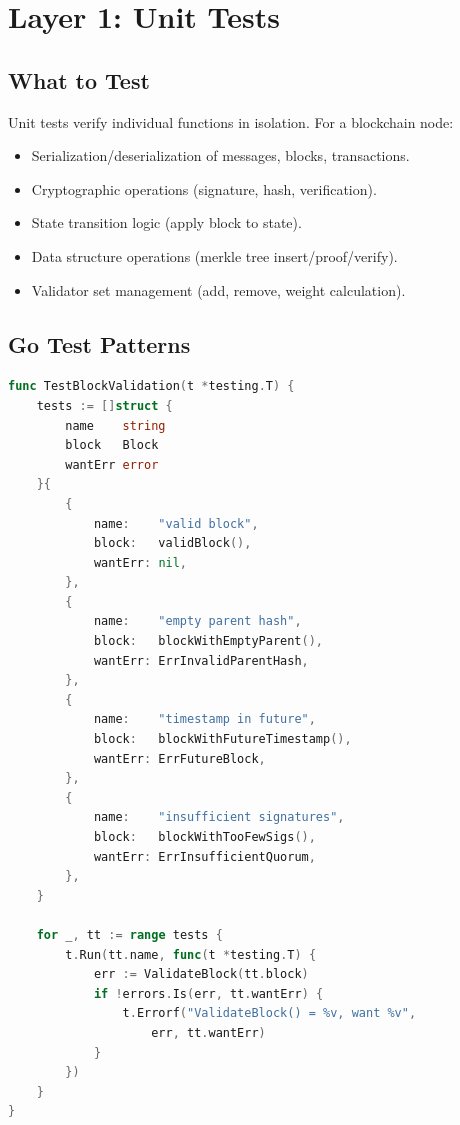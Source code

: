 \section{Layer 1: Unit Tests}


\subsection{What to Test}

Unit tests verify individual functions in isolation. For a blockchain node:

\begin{itemize}[nosep]
  \item Serialization/deserialization of messages, blocks, transactions.
  \item Cryptographic operations (signature, hash, verification).
  \item State transition logic (apply block to state).
  \item Data structure operations (merkle tree insert/proof/verify).
  \item Validator set management (add, remove, weight calculation).
\end{itemize}

\subsection{Go Test Patterns}

\begin{lstlisting}[language=Go,caption={Table-driven unit test}]
func TestBlockValidation(t *testing.T) {
    tests := []struct {
        name    string
        block   Block
        wantErr error
    }{
        {
            name:    "valid block",
            block:   validBlock(),
            wantErr: nil,
        },
        {
            name:    "empty parent hash",
            block:   blockWithEmptyParent(),
            wantErr: ErrInvalidParentHash,
        },
        {
            name:    "timestamp in future",
            block:   blockWithFutureTimestamp(),
            wantErr: ErrFutureBlock,
        },
        {
            name:    "insufficient signatures",
            block:   blockWithTooFewSigs(),
            wantErr: ErrInsufficientQuorum,
        },
    }

    for _, tt := range tests {
        t.Run(tt.name, func(t *testing.T) {
            err := ValidateBlock(tt.block)
            if !errors.Is(err, tt.wantErr) {
                t.Errorf("ValidateBlock() = %v, want %v",
                    err, tt.wantErr)
            }
        })
    }
}
\end{lstlisting}

